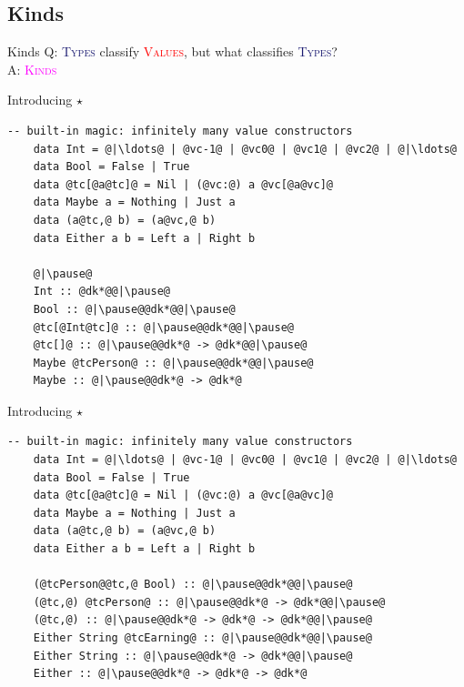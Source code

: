 \documentclass[xcolor={usenames,dvipsnames}]{beamer}
\newcommand{\htycon}[1]{\textcolor{MidnightBlue}{\textsc{#1}}}
\newcommand{\hvalcon}[1]{\textcolor{Red}{\textsc{#1}}}
\newcommand{\hkind}[1]{\textcolor{Fuchsia}{\textsc{#1}}}
\begin{document}
\subsection{Kinds}

\begin{frame}[fragile]{Kinds}
  Q: \htycon{Types} classify \hvalcon{Values}, but what classifies \htycon{Types}?\\
  \pause
  A: \hkind{Kinds}
\end{frame}

\begin{frame}[fragile]{Introducing $\star$}
  \begin{lstlisting}[style=hask]
    -- built-in magic: infinitely many value constructors
    data Int = @|\ldots@ | @vc-1@ | @vc0@ | @vc1@ | @vc2@ | @|\ldots@
    data Bool = False | True
    data @tc[@a@tc]@ = Nil | (@vc:@) a @vc[@a@vc]@
    data Maybe a = Nothing | Just a
    data (a@tc,@ b) = (a@vc,@ b)
    data Either a b = Left a | Right b

    @|\pause@
    Int :: @dk*@@|\pause@
    Bool :: @|\pause@@dk*@@|\pause@
    @tc[@Int@tc]@ :: @|\pause@@dk*@@|\pause@
    @tc[]@ :: @|\pause@@dk*@ -> @dk*@@|\pause@
    Maybe @tcPerson@ :: @|\pause@@dk*@@|\pause@
    Maybe :: @|\pause@@dk*@ -> @dk*@
  \end{lstlisting}
\end{frame}

\begin{frame}[fragile]{Introducing $\star$}
  \begin{lstlisting}[style=hask]
    -- built-in magic: infinitely many value constructors
    data Int = @|\ldots@ | @vc-1@ | @vc0@ | @vc1@ | @vc2@ | @|\ldots@
    data Bool = False | True
    data @tc[@a@tc]@ = Nil | (@vc:@) a @vc[@a@vc]@
    data Maybe a = Nothing | Just a
    data (a@tc,@ b) = (a@vc,@ b)
    data Either a b = Left a | Right b

    (@tcPerson@@tc,@ Bool) :: @|\pause@@dk*@@|\pause@
    (@tc,@) @tcPerson@ :: @|\pause@@dk*@ -> @dk*@@|\pause@
    (@tc,@) :: @|\pause@@dk*@ -> @dk*@ -> @dk*@@|\pause@
    Either String @tcEarning@ :: @|\pause@@dk*@@|\pause@
    Either String :: @|\pause@@dk*@ -> @dk*@@|\pause@
    Either :: @|\pause@@dk*@ -> @dk*@ -> @dk*@
  \end{lstlisting}
\end{frame}
\end{document}

